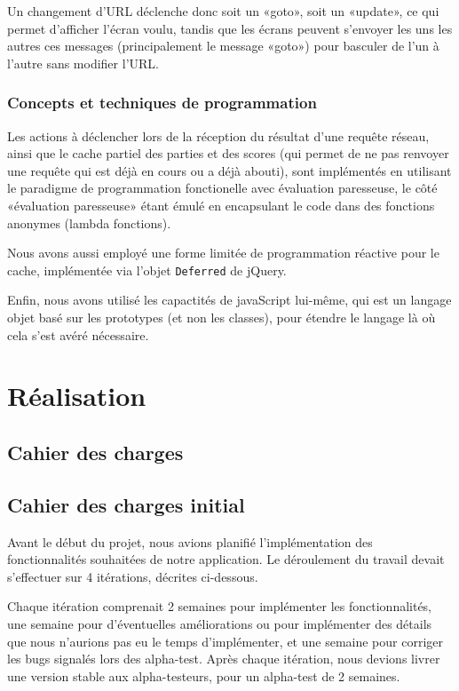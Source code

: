 \documentclass[a4paper,11pt,french]{article}
\begin{document}
Un changement d'URL déclenche donc soit un «goto», soit un «update», ce qui permet d'afficher l'écran voulu, tandis que les écrans peuvent
s'envoyer les uns les autres ces messages (principalement le message «goto») pour basculer de l'un à l'autre sans modifier l'URL.

\subsubsection{Concepts et techniques de programmation}

Les actions à déclencher lors de la réception du résultat d'une requête réseau, ainsi que le cache partiel des parties et des scores (qui
permet de ne pas renvoyer une requête qui est déjà en cours ou a déjà abouti), sont implémentés en utilisant le paradigme de programmation
fonctionelle avec évaluation paresseuse, le côté «évaluation paresseuse» étant émulé en encapsulant le code dans des fonctions anonymes
(lambda fonctions).

Nous avons aussi employé une forme limitée de programmation réactive pour le cache, implémentée via l'objet \verb!Deferred! de jQuery.

Enfin, nous avons utilisé les capactités de javaScript lui-même, qui est un langage objet basé sur les prototypes (et non les classes), pour
étendre le langage là où cela s'est avéré nécessaire.

\section{Réalisation}
\subsection{Cahier des charges}

\subsection{Cahier des charges initial}
Avant le début du projet, nous avions planifié l'implémentation des fonctionnalités souhaitées de notre application. Le déroulement du
travail devait s'effectuer sur 4 itérations, décrites ci-dessous.

Chaque itération comprenait 2 semaines pour implémenter les fonctionnalités, une semaine pour d'éventuelles améliorations ou pour
implémenter des détails que nous n'aurions pas eu le temps d'implémenter, et une semaine pour corriger les bugs signalés lors des
alpha-test. Après chaque itération, nous devions livrer une version stable aux alpha-testeurs, pour un alpha-test de 2 semaines.
\end{document}
